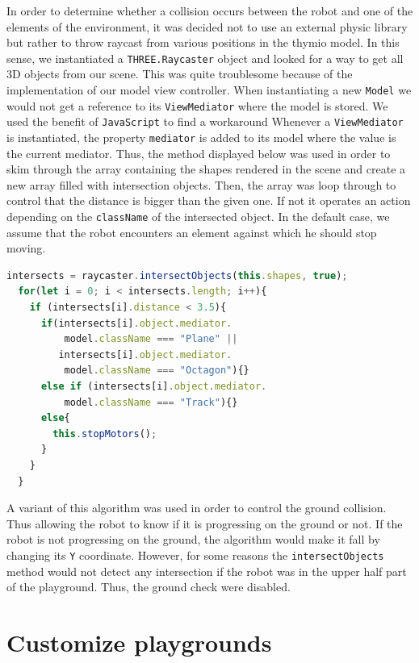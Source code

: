 \documentclass{scrreprt}
\begin{document}
In order to determine whether a collision occurs between the robot and one of the elements of the environment, it was decided not to use an external physic library but rather to throw raycast from various positions in the thymio model. In this sense, we instantiated a \texttt{THREE.Raycaster} 
object and looked for a way to get all 3D objects from our scene. This was quite troublesome because of the implementation of our model view controller. When instantiating a new \texttt{Model} we would not get a reference to its \texttt{ViewMediator} where the model is stored. 
We used the benefit of \texttt{JavaScript} to find a workaround Whenever a \texttt{ViewMediator} is instantiated, the property \texttt{mediator} is added to its model where the value is the current mediator. Thus, the method displayed below was used in order to skim through the array containing the shapes rendered in the scene and create a new array filled with intersection objects. Then, the array was loop through to control that the distance is bigger than the given one. If not it operates an action depending on the \texttt{className} of the intersected object. 
In the default case, we assume that the robot encounters an element against which he should stop moving.

\begin{lstlisting}[language=JavaScript, gobble=2, basicstyle=\ttfamily\small]
  intersects = raycaster.intersectObjects(this.shapes, true);
  for(let i = 0; i < intersects.length; i++){
    if (intersects[i].distance < 3.5){
      if(intersects[i].object.mediator.
          model.className === "Plane" ||
         intersects[i].object.mediator.
          model.className === "Octagon"){}
      else if (intersects[i].object.mediator.
          model.className === "Track"){}
      else{
        this.stopMotors();
      }
    }
  }
\end{lstlisting} 

A variant of this algorithm was used in order to control the ground collision. Thus allowing the robot to know if it is progressing on the ground or not. If the robot is not progressing on the ground, the algorithm would make it fall by changing its \texttt{Y} coordinate.
However, for some reasons the \texttt{intersectObjects} method would not detect any intersection if the robot was in the upper half part of the playground. Thus, the ground check were disabled.

\section{Customize playgrounds}
\end{document}
